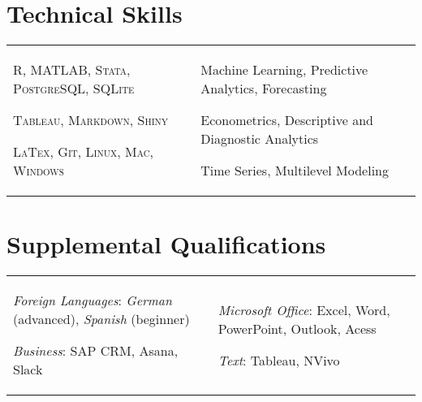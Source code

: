 \documentclass[a4paper,10pt]{article}
\begin{document}
\section{Technical Skills}
\begin{supertabular}{p{8.65cm} p{8.65cm}}

	\begin{enumerate*}[label =$\circ$, itemjoin={\newline}]
																\item \small \textsc{R, MATLAB, Stata, PostgreSQL, SQLite}
																\item \small \textsc{Tableau, Markdown, Shiny}
																\item \small \textsc{LaTex, Git, Linux, Mac, Windows }
																\end{enumerate*}


	& \begin{enumerate*}[label =$\circ$, itemjoin={\newline}]
                                \item \small Machine Learning, Predictive Analytics, Forecasting 
                                \item \small Econometrics, Descriptive and Diagnostic Analytics
                                \item \small Time Series, Multilevel Modeling \end{enumerate*}  \vspace{1mm} \\



\end{supertabular}



\section{Supplemental Qualifications}
\begin{supertabular}{p{8.65cm} p{8.65cm}}
	\begin{enumerate*}[label =$\circ$, itemjoin={\newline}]
		\item \small \emph{Foreign Languages}: \footnotesize \emph{German} (advanced), \emph{Spanish} (beginner)
	 	\item \small \emph{Business}: \footnotesize SAP CRM, Asana, Slack
	\end{enumerate*}

	& \begin{enumerate*}[label =$\circ$, itemjoin={\newline}]
	 	\item \small \emph{Microsoft Office}: \footnotesize Excel, Word, PowerPoint, Outlook, Acess	
	 	\item \small \emph{Text}: \footnotesize Tableau, NVivo
	\end{enumerate*} \\

\end{supertabular}
\end{document}
